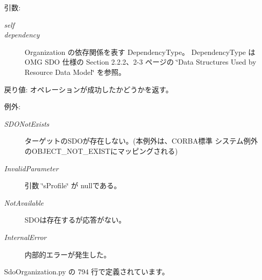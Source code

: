 \begin{Desc}
\item[引数:]
\begin{description}
\item[{\em self}]\item[{\em dependency}]Organization の依存関係を表す DependencyType。 DependencyType は OMG SDO 仕様の Section 2.2.2、2-3 ページの \char`\"{}Data Structures Used by Resource Data Model\char`\"{} を参照。\end{description}
\end{Desc}
\begin{Desc}
\item[戻り値:]オペレーションが成功したかどうかを返す。\end{Desc}
\begin{Desc}
\item[例外:]
\begin{description}
\item[{\em SDONotExists}]ターゲットのSDOが存在しない。(本例外は、CORBA標準 システム例外のOBJECT\_\-NOT\_\-EXISTにマッピングされる) \item[{\em InvalidParameter}]引数 \char`\"{}sProfile\char`\"{} が nullである。 \item[{\em NotAvailable}]SDOは存在するが応答がない。 \item[{\em InternalError}]内部的エラーが発生した。 \end{description}
\end{Desc}


 SdoOrganization.py の 794 行で定義されています。